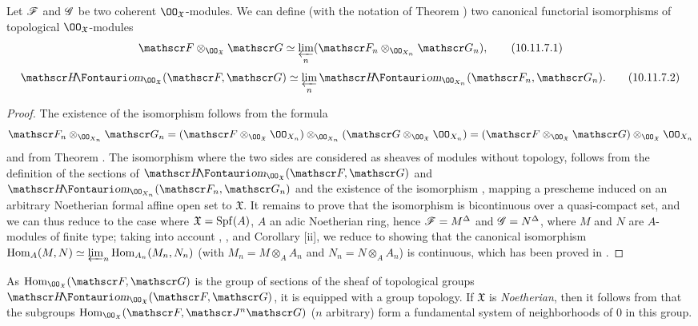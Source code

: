 \begin{prop}[10.11.7]
\label{1.10.11.7}
Let $\mathscr{F}$ and $\mathscr{G}$ be two coherent $\OO_\mathfrak{X}$-modules.
We can define (with the notation of Theorem ) two canonical functorial isomorphisms of topological $\OO_\mathfrak{X}$-modules 
\begin{equation*}
\label{1.10.11.7.1}
  \sh{F}\otimes_{\OO_\mathfrak{X}}\sh{G}\isoto\varprojlim_n(\sh{F}_n\otimes_{\OO_{X_n}}\sh{G}_n),
  \tag{10.11.7.1}
\end{equation*}
\begin{equation*}
\label{1.10.11.7.2}
  \shHom_{\OO_\mathfrak{X}}(\sh{F},\sh{G})\isoto\varprojlim_n\shHom_{\OO_{X_n}}(\sh{F}_n,\sh{G}_n).
  \tag{10.11.7.2}
\end{equation*}
\end{prop}

\begin{proof}
\label{proof-1.10.11.7}
The existence of the isomorphism  follows from the formula
\[
  \sh{F}_n\otimes_{\OO_{X_n}}\sh{G}_n=(\sh{F}\otimes_{\OO_\mathfrak{X}}\OO_{X_n})\otimes_{\OO_{X_n}}(\sh{G}\otimes_{\OO_\mathfrak{X}}\OO_{X_n})=(\sh{F}\otimes_{\OO_\mathfrak{X}}\sh{G})\otimes_{\OO_\mathfrak{X}}\OO_{X_n}
\]
and from Theorem .
The isomorphism  where the two sides are considered as sheaves of modules without topology, follows from the definition of the sections of $\shHom_{\OO_\mathfrak{X}}(\sh{F},\sh{G})$ and $\shHom_{\OO_{X_n}}(\sh{F}_n,\sh{G}_n)$ and the existence of the isomorphism , mapping a prescheme induced on an arbitrary Noetherian formal affine open set to $\mathfrak{X}$.
It remains to prove that the isomorphism  is bicontinuous over a quasi-compact set, and we can thus reduce to the case where $\mathfrak{X}=\operatorname{Spf}(A)$, $A$ an adic Noetherian ring, hence  $\mathscr{F}=M^\Delta$ and $\mathscr{G}=N^\Delta$, where $M$ and $N$ are $A$-modules of finite type; taking into account , , and Corollary [ii], we reduce to showing that the canonical isomorphism $\operatorname{Hom}_A(M,N)\simeq\varprojlim_n\operatorname{Hom}_{A_n}(M_n,N_n)$ (with $M_n=M\otimes_A A_n$ and $N_n=N\otimes_A A_n$) is continuous, which has been proved in .
\end{proof}

\begin{env}[10.11.8]
\label{1.10.11.8}
As $\Hom_{\OO_\mathfrak{X}}(\sh{F},\sh{G})$ is the group of sections of the sheaf of topological groups $\shHom_{\OO_\mathfrak{X}}(\sh{F},\sh{G})$, it is equipped with a group topology.
If $\mathfrak{X}$ is \emph{Noetherian}, then it follows from  that the subgroups $\Hom_{\OO_\mathfrak{X}}(\sh{F},\sh{J}^n\sh{G})$ ($n$ arbitrary) form a fundamental system of neighborhoods of $0$ in this group.
\end{env}

